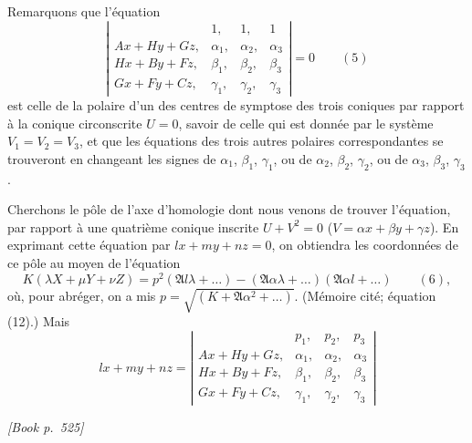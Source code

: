 \documentclass[11pt]{article}
\begin{document}
Remarquons que l'\'equation
\[
\left|\begin{array}{cccc}
 & 1, & 1, & 1 \\
A x + H y + G z, & \alpha_{1}, & \alpha_{2}, & \alpha_{3} \\
H x + B y + F z, & \beta_{1}, & \beta_{2}, & \beta_{3} \\
G x + F y + C z, & \gamma_{1}, & \gamma_{2}, & \gamma_{3}
\end{array}\right| = 0 \qquad (5)
\]
est celle de la polaire d'un des centres de symptose des trois coniques par rapport \`a la conique circonscrite $U=0$, savoir de celle qui est donn\'ee par le syst\`eme $V_{1}=V_{2}=V_{3}$, et que les \'equations des trois autres polaires correspondantes se trouveront en changeant les signes de $\alpha_{1}$, $\beta_{1}$, $\gamma_{1}$, ou de $\alpha_{2}$, $\beta_{2}$, $\gamma_{2}$, ou de $\alpha_{3}$, $\beta_{3}$, $\gamma_{3}$.

Cherchons le p\^ole de l'axe d'homologie dont nous venons de trouver l'\'equation, par rapport \`a une quatri\`eme conique inscrite $U + V^{2} = 0$ ($V = \alpha x + \beta y + \gamma z$). En exprimant cette \'equation par $l x + m y + n z = 0$, on obtiendra les coordonn\'ees de ce p\^ole au moyen de l'\'equation
\[
K(\lambda X + \mu Y + \nu Z) = p^{2}(\mathfrak{A} l \lambda + \dots) - (\mathfrak{A}\alpha\lambda+\dots)(\mathfrak{A}\alpha l+\dots) \qquad (6),
\]
o\`u, pour abr\'eger, on a mis $p = \sqrt{(K+\mathfrak{A}\alpha^{2}+\dots)}$. (M\'emoire cit\'e; \'equation (12).) Mais
\[
l x + m y + n z = \left|\begin{array}{cccc}
 & p_{1}, & p_{2}, & p_{3} \\
A x + H y + G z, & \alpha_{1}, & \alpha_{2}, & \alpha_{3} \\
H x + B y + F z, & \beta_{1}, & \beta_{2}, & \beta_{3} \\
G x + F y + C z, & \gamma_{1}, & \gamma_{2}, & \gamma_{3}
\end{array}\right|
\]

\medskip
\noindent\textit{[Book p.~525]}\hfill

\smallskip
\end{document}
